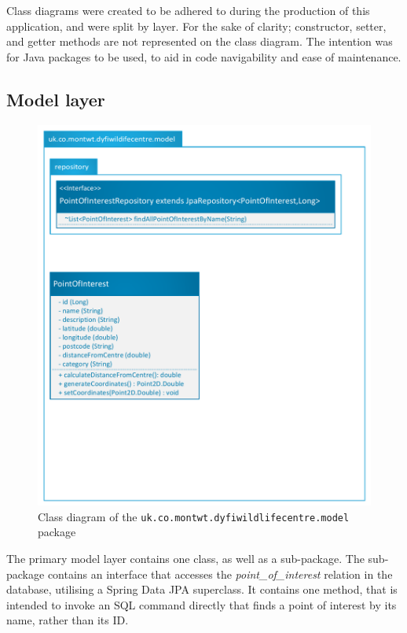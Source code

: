 Class diagrams were created to be adhered to during the production of this application, and were split by layer. For the sake of clarity; constructor, setter, and getter methods are not represented on the class diagram. The intention was for Java packages to be used, to aid in code navigability and ease of maintenance.

\subsection{Model layer}
\begin{figure}[H]
	\includegraphics[scale=0.7]{diagrams/model}
	\caption{Class diagram of the \texttt{uk.co.montwt.dyfiwildlifecentre.model} package}
\end{figure}	

The primary model layer contains one class, as well as a sub-package. The sub-package contains an interface that accesses the \textit{point\_of\_interest} relation in the database, utilising a Spring Data JPA superclass. It contains one method, that is intended to invoke an SQL command directly that finds a point of interest by its name, rather than its ID.

